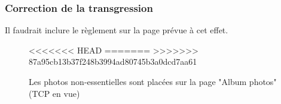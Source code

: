 \documentclass{article}[12pt]
\begin{document}
     \subsubsection*{Correction de la transgression}
    Il faudrait inclure le règlement sur la page prévue à cet effet.
     \begin{figure}[H]
     	\centering
<<<<<<< HEAD
=======
>>>>>>> 87a95cb13b37f248b3994ad80745b3a0dcd7aa61
     	\caption{Les photos non-essentielles sont placées sur la page "Album photos" (TCP en vue)}
     \end{figure}
\end{document}
